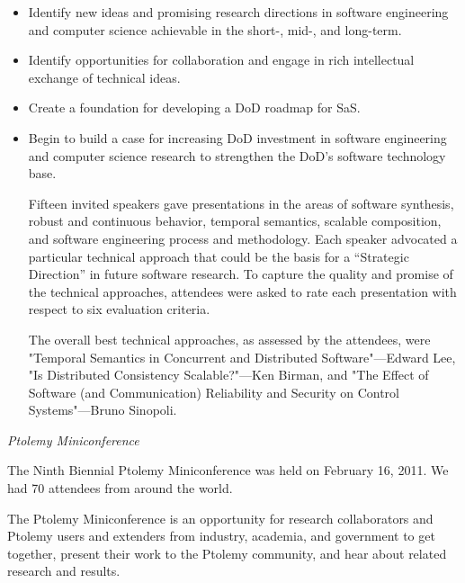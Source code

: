                  \begin{itemize}
                 \item Identify new ideas and promising research directions in software engineering and computer science achievable in the short-, mid-, and long-term.
                 \item Identify opportunities for collaboration and engage in rich intellectual exchange of technical ideas.
                 \item Create a foundation for developing a DoD roadmap for SaS.
                 \item Begin to build a case for increasing DoD investment in software engineering and computer science research to strengthen the DoD’s software technology base.

                   Fifteen invited speakers gave presentations in the areas of software synthesis, robust and continuous behavior, temporal semantics, scalable composition, and software engineering process and methodology. Each speaker advocated a particular technical approach that could be the basis for a “Strategic Direction” in future software research. To capture the quality and promise of the technical approaches, attendees were asked to rate each presentation with respect to six evaluation criteria.
                   

                   The overall best technical approaches, as assessed by the attendees, were "Temporal Semantics in Concurrent and Distributed Software"—Edward Lee, "Is Distributed Consistency Scalable?"—Ken Birman, and "The Effect of Software (and Communication) Reliability and Security on Control Systems"—Bruno Sinopoli.
                 \end{itemize}

\noindent \emph{Ptolemy Miniconference}

                 The Ninth Biennial Ptolemy Miniconference was held on February 16, 2011.  We had 70 attendees from around the world.

                 The Ptolemy Miniconference is an opportunity for research
                 collaborators and Ptolemy users and extenders from industry, academia,
                 and government to get together, present their work to the Ptolemy
                 community, and hear about related research and results.

